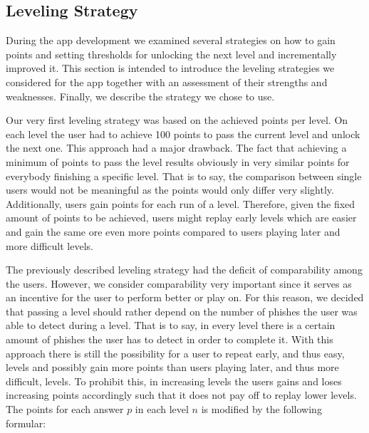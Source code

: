 \subsection{Leveling Strategy}
\label{s:leveling}
During the app development we examined several strategies on how to gain points and setting thresholds for unlocking the next level and incrementally improved it.
 This section is intended to introduce the leveling strategies we considered for the app together with an assessment of their strengths and weaknesses.
Finally, we describe the strategy we chose to use.

\begin{description}[leftmargin=0cm]
	\item[Leveling Based on Achieved Points] Our very first leveling strategy was based on the achieved points per level.
 On each level the user had to achieve 100 points to pass the current level and unlock the next one.
 This approach had a major drawback.
 The fact that achieving a minimum of points to pass the level results obviously in very similar points for everybody finishing a specific level.
 That is to say, the comparison between single users would not be meaningful as the points would only differ very slightly.
 Additionally, users gain points for each run of a level. Therefore, given the fixed amount of points to be achieved, users might replay early levels which are easier and gain the same ore even more points compared to users playing later and more difficult levels.
	\item[Leveling Based on Detected Phishes] The previously described leveling strategy had the deficit of comparability among the users.
 However, we consider comparability very important  since it serves as an incentive for the user to perform better or play on.
 For this reason, we decided that passing a level should rather depend on the number of phishes the user was able to detect during a level.
 That is to say, in every level there is a certain amount of phishes the user has to detect in order to complete it.
 With this approach there is still the possibility for a user to repeat early, and thus easy, levels and possibly gain more points than users playing later, and thus more difficult, levels.
 To prohibit this, in increasing levels the users gains and loses increasing points accordingly such that it does not pay off to replay lower levels.
 The points for each answer $p$ in each level $n$ is modified by the following formular:

\end{description}
